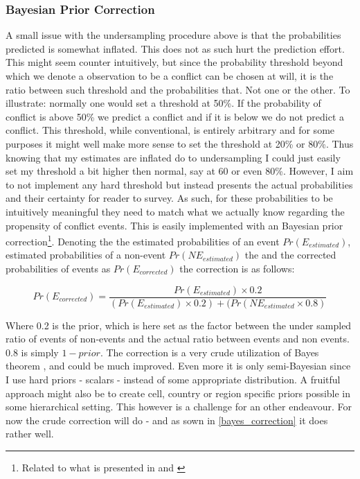 \documentclass[a4paper]{article}
\begin{document}
\subsubsection{Bayesian Prior Correction}\label{bayes_correction}

A small issue with the undersampling procedure above is that the probabilities predicted is somewhat inflated. This does not as such hurt the prediction effort. This might seem counter intuitively, but since the probability threshold beyond which we denote a observation to be a conflict can be chosen at will, it is the ratio between such threshold and the probabilities that. Not one or the other. To illustrate: normally one would set a threshold at 50\%. If the probability of conflict is above 50\% we predict a conflict and if it is below we do not predict a conflict. This threshold, while conventional, is entirely arbitrary and for some purposes it might well make more sense to set the threshold at 20\% or 80\%. Thus knowing that my estimates are inflated do to undersampling I could just easily set my threshold a bit higher then normal, say at 60 or even 80\%. However, I aim to not implement any hard threshold but instead presents the actual probabilities and their certainty for reader to survey. As such, for these probabilities to be intuitively meaningful they need to match what we actually know regarding the propensity of conflict events. This is easily implemented with an Bayesian prior correction\footnote{Related to what is presented in \cite{King_Zeng_2001, king_zeng_2001b} and \cite{Goldstone_2010}}. Denoting the the estimated probabilities of an event $Pr(E_{estimated})$, estimated probabilities of a non-event $Pr(NE_{estimated})$ the  and the corrected probabilities of events as $Pr(E_{corrected})$ the correction is as follows:

\[
Pr(E_{corrected}) = \frac{Pr(E_{estimated}) \times 0.2}{(Pr(E_{estimated}) \times 0.2)+(Pr(NE_{estimated} \times 0.8)} \tag{1} \label{eq:bayes}
\]

Where 0.2 is the prior, which is here set as the factor between the under sampled ratio of events of non-events and the actual ratio between events and non events. 0.8 is simply $1-prior$. The correction is a very crude utilization of Bayes theorem \citep[7-8]{Gelman_2013}, and could be much improved. Even more it is only semi-Bayesian since I use hard priors - scalars - instead of some appropriate distribution. A fruitful approach might also be to create cell, country or region specific priors possible in some hierarchical setting. This however is a challenge for an other endeavour. For now the crude correction will do - and as sown in \autoref{bayes_correction} it does rather well.\par
\end{document}
